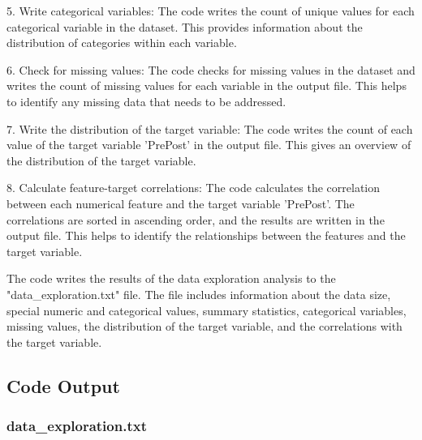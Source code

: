 \documentclass[11pt]{article}
\begin{document}
5. Write categorical variables: The code writes the count of unique values for each categorical variable in the dataset. This provides information about the distribution of categories within each variable.

6. Check for missing values: The code checks for missing values in the dataset and writes the count of missing values for each variable in the output file. This helps to identify any missing data that needs to be addressed.

7. Write the distribution of the target variable: The code writes the count of each value of the target variable 'PrePost' in the output file. This gives an overview of the distribution of the target variable.

8. Calculate feature-target correlations: The code calculates the correlation between each numerical feature and the target variable 'PrePost'. The correlations are sorted in ascending order, and the results are written in the output file. This helps to identify the relationships between the features and the target variable.

The code writes the results of the data exploration analysis to the "data\_exploration.txt" file. The file includes information about the data size, special numeric and categorical values, summary statistics, categorical variables, missing values, the distribution of the target variable, and the correlations with the target variable.

\subsection{Code Output}

\subsubsection*{data\_exploration.txt}
\end{document}
